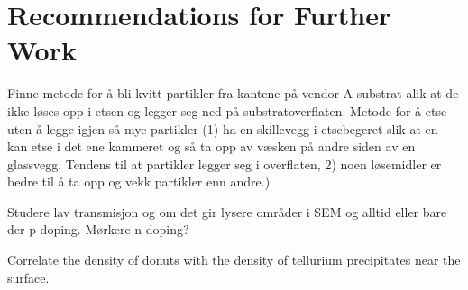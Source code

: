 \chapter{Recommendations for Further Work}\label{ch:further-work}
%

Finne metode for å bli kvitt partikler fra kantene på vendor A substrat alik at de ikke løses opp i etsen og legger seg ned på substratoverflaten. Metode for å etse uten å legge igjen så mye partikler (1) ha en skillevegg i etsebegeret slik at en kan etse i det ene kammeret og så ta opp av væsken på andre siden av en glassvegg. Tendens til at partikler legger seg i overflaten, 2) noen løsemidler er bedre til å ta opp og vekk partikler enn andre.)

Studere lav transmisjon og om det gir lysere områder i SEM og alltid eller bare der p-doping. Mørkere n-doping?

Correlate the density of donuts with the density of tellurium precipitates near the surface.




